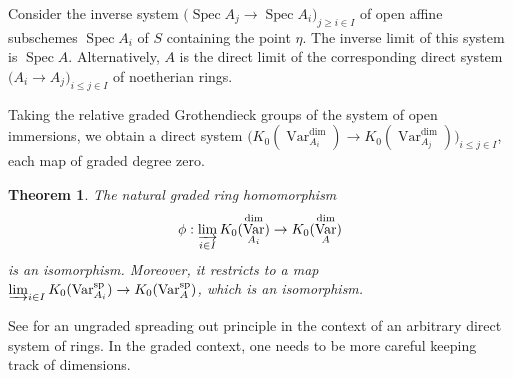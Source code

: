 \documentclass{amsart}
\newtheorem{thm}{Theorem}[section]
\theoremstyle{definition}
\DeclareMathOperator{\Var}{Var}
\DeclareMathOperator{\spr}{sp}
\numberwithin{equation}{section}
\begin{document}
Consider the inverse system $\big(\mathop{\mathrm{Spec}}A_j \rightarrow \mathop{\mathrm{Spec}}A_i \big)_{j \geq i \in I}$ of open affine subschemes $\mathop{\mathrm{Spec}}A_i$ of $S$ containing the point $\eta$. The inverse limit of this system is $\mathop{\mathrm{Spec}}A$. Alternatively, $A$ is the direct limit of the corresponding direct system $\big( A_i \rightarrow A_j \big)_{i \leq j \in I}$ of noetherian rings.

Taking the relative graded Grothendieck groups of the system of open immersions, we obtain a direct system $\big( K_0(\Var_{A_i}^{\dim}) \rightarrow K_0(\Var_{A_j}^{\dim}) \big)_{i \leq j \in I}$, each map of graded degree zero.

\begin{thm}\label{Spreading Out}
The natural graded ring homomorphism
\begin{align*}
    \phi: \varinjlim_{i \in I} K_0(\Var_{A_i}^{\dim}) \rightarrow K_0(\Var_A^{\dim})
\end{align*}
is an isomorphism. Moreover, it restricts to a map $\varinjlim_{i \in I} K_0(\Var_{A_i}^{\spr}) \rightarrow K_0(\Var_A^{\spr})$, which is an isomorphism.
\end{thm}

See \cite[Section $3.4$]{spreadingout} for an ungraded spreading out principle in the context of an arbitrary direct system of rings. In the graded context, one needs to be more careful keeping track of dimensions. 
\end{document}
